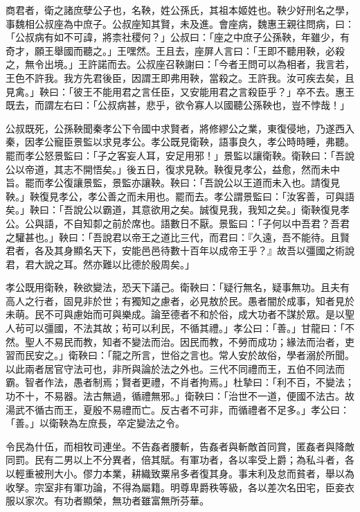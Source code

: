 
\begin{pinyinscope}
商君者，衛之諸庶孽公子也，名鞅，姓公孫氏，其祖本姬姓也。鞅少好刑名之學，事魏相公叔座為中庶子。公叔座知其賢，未及進。會座病，魏惠王親往問病，曰：「公叔病有如不可諱，將柰社稷何？」公叔曰：「座之中庶子公孫鞅，年雖少，有奇才，願王舉國而聽之。」王嘿然。王且去，座屏人言曰：「王即不聽用鞅，必殺之，無令出境。」王許諾而去。公叔座召鞅謝曰：「今者王問可以為相者，我言若，王色不許我。我方先君後臣，因謂王即弗用鞅，當殺之。王許我。汝可疾去矣，且見禽。」鞅曰：「彼王不能用君之言任臣，又安能用君之言殺臣乎？」卒不去。惠王既去，而謂左右曰：「公叔病甚，悲乎，欲令寡人以國聽公孫鞅也，豈不悖哉！」

公叔既死，公孫鞅聞秦孝公下令國中求賢者，將修繆公之業，東復侵地，乃遂西入秦，因孝公寵臣景監以求見孝公。孝公既見衛鞅，語事良久，孝公時時睡，弗聽。罷而孝公怒景監曰：「子之客妄人耳，安足用邪！」景監以讓衛鞅。衛鞅曰：「吾說公以帝道，其志不開悟矣。」後五日，復求見鞅。鞅復見孝公，益愈，然而未中旨。罷而孝公復讓景監，景監亦讓鞅。鞅曰：「吾說公以王道而未入也。請復見鞅。」鞅復見孝公，孝公善之而未用也。罷而去。孝公謂景監曰：「汝客善，可與語矣。」鞅曰：「吾說公以霸道，其意欲用之矣。誠復見我，我知之矣。」衛鞅復見孝公。公與語，不自知厀之前於席也。語數日不厭。景監曰：「子何以中吾君？吾君之驩甚也。」鞅曰：「吾說君以帝王之道比三代，而君曰：『久遠，吾不能待。且賢君者，各及其身顯名天下，安能邑邑待數十百年以成帝王乎？』故吾以彊國之術說君，君大說之耳。然亦難以比德於殷周矣。」

孝公既用衛鞅，鞅欲變法，恐天下議己。衛鞅曰：「疑行無名，疑事無功。且夫有高人之行者，固見非於世；有獨知之慮者，必見敖於民。愚者闇於成事，知者見於未萌。民不可與慮始而可與樂成。論至德者不和於俗，成大功者不謀於眾。是以聖人茍可以彊國，不法其故；茍可以利民，不循其禮。」孝公曰：「善。」甘龍曰：「不然。聖人不易民而教，知者不變法而治。因民而教，不勞而成功；緣法而治者，吏習而民安之。」衛鞅曰：「龍之所言，世俗之言也。常人安於故俗，學者溺於所聞。以此兩者居官守法可也，非所與論於法之外也。三代不同禮而王，五伯不同法而霸。智者作法，愚者制焉；賢者更禮，不肖者拘焉。」杜摯曰：「利不百，不變法；功不十，不易器。法古無過，循禮無邪。」衛鞅曰：「治世不一道，便國不法古。故湯武不循古而王，夏殷不易禮而亡。反古者不可非，而循禮者不足多。」孝公曰：「善。」以衛鞅為左庶長，卒定變法之令。

令民為什伍，而相牧司連坐。不告姦者腰斬，告姦者與斬敵首同賞，匿姦者與降敵同罰。民有二男以上不分異者，倍其賦。有軍功者，各以率受上爵；為私斗者，各以輕重被刑大小。僇力本業，耕織致粟帛多者復其身。事末利及怠而貧者，舉以為收孥。宗室非有軍功論，不得為屬籍。明尊卑爵秩等級，各以差次名田宅，臣妾衣服以家次。有功者顯榮，無功者雖富無所芬華。


\end{pinyinscope}
